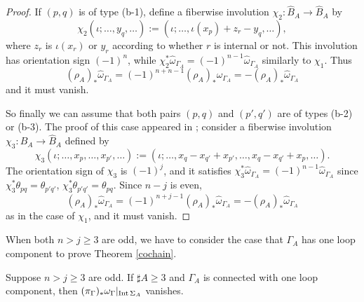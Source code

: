 \begin{proof}
If $(p,q)$ is of type (b-1), define a fiberwise involution $\chi_2 :\hat{B}_A \to \hat{B}_A$ by
\[
 \chi_2 (\iota ; \dots ,y_q , \dots ) := (\iota ; \dots ,\iota(x_p )+ z_r -y_q ,\dots ),
\]
where $z_r$ is $\iota(x_r )$ or $y_r$ according to whether $r$ is internal or not.
This involution has orientation sign $(-1)^n$, while $\chi^*_2 \hat{\omega}_{\Gamma_A}=(-1)^{n-1}\hat{\omega}_{\Gamma_A}$
similarly to $\chi_1$.
Thus
\[
 (\rho_A )_* \hat{\omega}_{\Gamma_A} =(-1)^{n+n-1}(\rho_A )_* \hat{\omega}_{\Gamma_A}
 =-(\rho_A )_* \hat{\omega}_{\Gamma_A}
\]
and it must vanish.


So finally we can assume that both pairs $(p,q)$ and $(p' ,q' )$ are of types (b-2) or (b-3).
The proof of this case appeared in \cite{Rossi_thesis, Watanabe07}; consider a fiberwise involution
$\chi_3 :\hat{B}_A \to \hat{B}_A$ defined by
\[
 \chi_3 (\iota ; \dots ,x_p , \dots ,x_{p'},\dots )
 := (\iota ; \dots , x_q -x_{q'} + x_{p'}, \dots ,x_q - x_{q'} + x_p , \dots ).
\]
The orientation sign of $\chi_3$ is $(-1)^j$, and it satisfies
$\chi^*_3 \hat{\omega}_{\Gamma_A}=(-1)^{n-1}\hat{\omega}_{\Gamma_A}$ since $\chi^*_3 \theta_{pq}=\theta_{p' q'}$,
$\chi^*_3 \theta_{p'q'}=\theta_{pq}$.
Since $n-j$ is even,
\[
 (\rho_A )_* \hat{\omega}_{\Gamma_A} =(-1)^{n+j-1}(\rho_A )_* \hat{\omega}_{\Gamma_A}
 =-(\rho_A )_* \hat{\omega}_{\Gamma_A}
\]
as in the case of $\chi_1$, and it must vanish.
\end{proof}


When both $n>j\ge 3$ are odd, we have to consider the case that $\Gamma_A$ has one loop component to prove Theorem
\ref{cochain}.


\begin{prop}
Suppose $n>j\ge 3$ are odd.
If $\sharp A \ge 3$ and $\Gamma_A$ is connected with one loop component, then
$(\pi_{\Gamma})_* \omega_{\Gamma}|_{\mathrm{Int}\, \Sigma_A}$ vanishes.
\end{prop}


